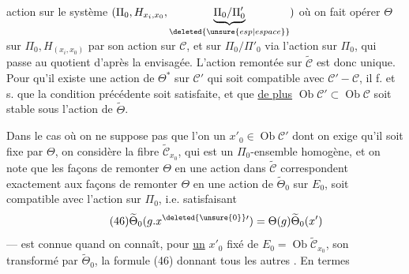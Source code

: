 action sur  le système $(\Pi_0,H_{x_i,x_0},\underbrace{\Pi_0/\Pi'_0}_{\deleted{\unsure{esp|espace}}})$ où on fait opérer $\Theta$ sur $\Pi_0,H_{(x_i,x_0)}$ par son action sur $\mathcal C$, et sur $\Pi_0/\Pi'_0$ via l'action sur $\Pi_0$, qui passe au quotient d'après la    envisagée. L'action  remontée   sur $\widetilde{\mathcal C}$ est donc unique. Pour qu'il existe une action de $\Theta^{*}$ sur $\mathcal C'$ qui soit compatible avec $\mathcal C'-\mathcal C$, il f. et s. que la condition précédente soit satisfaite, et que \uline{de plus} $\operatorname{Ob}\mathcal C'\subset\operatorname{Ob}\mathcal C$ soit stable sous  l'action de $\widetilde\Theta$.

Dans le cas où on ne suppose pas que l'on   un $x'_0\in\operatorname{Ob}\mathcal C'$ dont on exige qu'il soit fixe par $\Theta$, on considère la fibre  $\widetilde{\mathcal C}_{x_0}$, qui est un $\Pi_0$-ensemble  homogène, et on note que les façons de remonter $\Theta$ en une action \inserted{$\widetilde\Theta$} dans $\widetilde{\mathcal C}$ correspondent  exactement aux façons de remonter $\Theta$ en une action de $\widetilde\Theta_0$ sur $E_0$,  soit compatible avec l'action sur $\Pi_0$, i.e. satisfaisant
\[
\tag{46}\widetilde\Theta_0(g.x^{\deleted{\unsure{0}}\prime})=\Theta(g)\widetilde\Theta_0(x')
\]
---   est connue quand on connaît, pour \uline{un} $x'_0$ fixé de $E_0=\operatorname{Ob}\widetilde{\mathcal C}_{x_0}$, son transformé par $\widetilde\Theta_0$, la formule (46) donnant tous les autres . En termes
